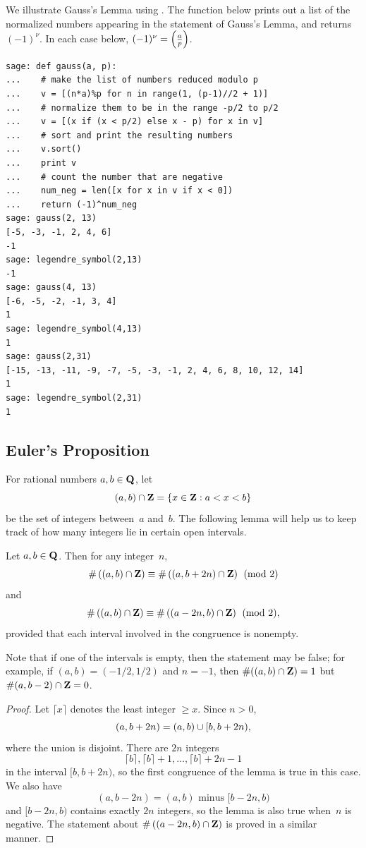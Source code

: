 \begin{sg}
We illustrate Gauss's Lemma using \sage.  The  function
below prints out a list of the normalized
numbers appearing in the statement of Gauss's Lemma,
and returns $(-1)^{\nu}$.  In each case below, $(-1)^{\nu} = \left(\frac{a}{p}\right)$.
\begin{verbatim}
sage: def gauss(a, p):
...    # make the list of numbers reduced modulo p
...    v = [(n*a)%p for n in range(1, (p-1)//2 + 1)]
...    # normalize them to be in the range -p/2 to p/2
...    v = [(x if (x < p/2) else x - p) for x in v]
...    # sort and print the resulting numbers
...    v.sort()
...    print v
...    # count the number that are negative
...    num_neg = len([x for x in v if x < 0])
...    return (-1)^num_neg
sage: gauss(2, 13)
[-5, -3, -1, 2, 4, 6]
-1
sage: legendre_symbol(2,13)
-1
sage: gauss(4, 13)
[-6, -5, -2, -1, 3, 4]
1
sage: legendre_symbol(4,13)
1
sage: gauss(2,31)
[-15, -13, -11, -9, -7, -5, -3, -1, 2, 4, 6, 8, 10, 12, 14]
1
sage: legendre_symbol(2,31)
1
\end{verbatim}
\end{sg}


\subsection{Euler's Proposition}
For rational numbers $a,b\in\mathbf{Q}$, let
$$
(a,b)\cap\mathbf{Z} = \{x \in \mathbf{Z} : a < x < b\}
$$
be the set of integers between~$a$ and~$b$.  The following
lemma will help us to keep track of how many integers lie in
certain open intervals.
\begin{lemma}\label{lem:even}
Let $a, b\in\mathbf{Q}$.  Then for any integer~$n$,
$$\#\left((a,b)\cap \mathbf{Z}\right) \equiv \#\left((a,b+2n)\cap \mathbf{Z}\right) \pmod{2}$$
and
$$
\#\left((a,b)\cap \mathbf{Z}\right) \equiv \#\left((a-2n,b)\cap \mathbf{Z}\right) \pmod{2},
$$
provided that each interval involved in the congruence is nonempty.
\end{lemma}
Note
that if one of the intervals is empty, then the statement may be false;
for example, if $(a,b)=(-1/2,1/2)$ and $n=-1$, then $\#((a,b)\cap\mathbf{Z}) = 1$
but $\#(a,b-2)\cap\mathbf{Z} = 0$.
\begin{proof}
Let $\lceil x\rceil$ denotes
the least integer $\geq x$.
Since $n>0$,
$$(a,b+2n) = (a,b) \cup [b,b+2n),$$
where the union is disjoint.  There are $2n$ integers
$$
\lceil b\rceil, \lceil b\rceil+1, \ldots, \lceil b\rceil +2n-1
$$
in the interval $[b,b+2n)$, so the first congruence of the lemma
is true in this case.  We also have
$$
(a,b-2n) = (a,b)\text{ minus } [b-2n,b)
$$
and $[b-2n,b)$ contains exactly $2n$ integers, so the lemma is
also true when~$n$ is negative.  The statement about
$\#\left((a-2n,b)\cap \mathbf{Z}\right)$ is proved in a similar manner.
\end{proof}

